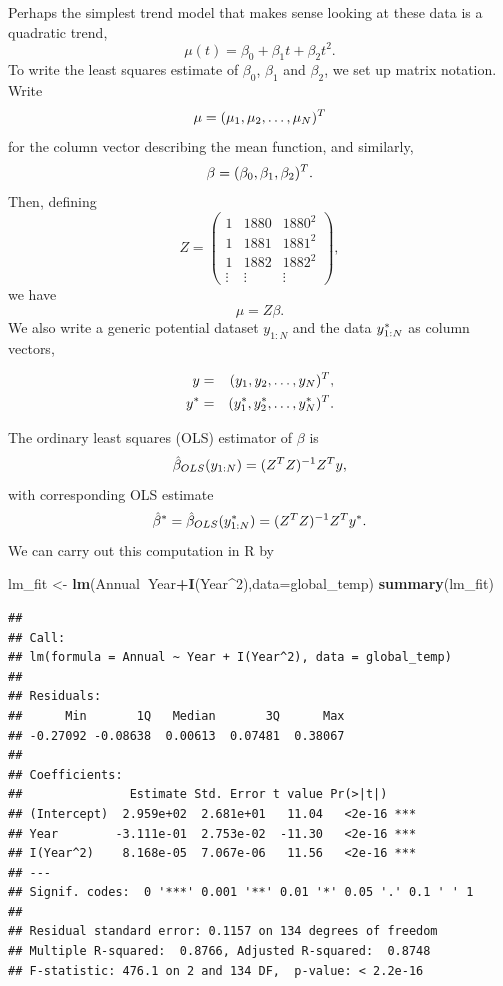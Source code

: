\documentclass[]{article}
\newenvironment{Shaded}{\begin{snugshade}}{\end{snugshade}}
\newcommand{\KeywordTok}[1]{\textcolor[rgb]{0.13,0.29,0.53}{\textbf{#1}}}
\newcommand{\DataTypeTok}[1]{\textcolor[rgb]{0.13,0.29,0.53}{#1}}
\newcommand{\DecValTok}[1]{\textcolor[rgb]{0.00,0.00,0.81}{#1}}
\newcommand{\StringTok}[1]{\textcolor[rgb]{0.31,0.60,0.02}{#1}}
\newcommand{\OperatorTok}[1]{\textcolor[rgb]{0.81,0.36,0.00}{\textbf{#1}}}
\newcommand{\NormalTok}[1]{#1}
\begin{document}
Perhaps the simplest trend model that makes sense looking at these data
is a quadratic trend, \[\mu(t)= \beta_0 + \beta_1 t + \beta_2 t^2.\] To
write the least squares estimate of \(\beta_0\), \(\beta_1\) and
\(\beta_2\), we set up matrix notation. Write
\[ \mu = (\mu_1,\mu_2,\dots,\mu_N)^{\scriptsize{T}}\] for the column vector
describing the mean function, and similarly,
\[ \beta = (\beta_0,\beta_1,\beta_2)^{\scriptsize{T}}.\] Then, defining
\[ Z = \left(\begin{array}{ccc}
1 & 1880 & 1880^2 \\
1 & 1881 & 1881^2 \\
1 & 1882 & 1882^2 \\
\vdots & \vdots & \vdots
\end{array}\right),\] we have \[ \mu = Z\beta.\] We also write a generic
potential dataset \(y_{1:N}\) and the data \(y_{1:N}^*\) as column
vectors,

\begin{eqnarray}
y &=& (y_1,y_2,\dots,y_N)^{\scriptsize{T}},\\
y^* & =& (y_1^*,y_2^*,\dots,y_N^*)^{\scriptsize{T}}.
\end{eqnarray}

The ordinary least squares (OLS) estimator of \(\beta\) is
\[\hat\beta_{OLS}(y_{1:N}) = (Z^{\scriptsize{T}} Z)^{-1}Z^{\scriptsize{T}} y,\]
with corresponding OLS estimate
\[\hat\beta^*=\hat\beta_{OLS}(y_{1:N}^*) = (Z^{\scriptsize{T}} Z)^{-1}Z^{\scriptsize{T}} y^*.\]
We can carry out this computation in R by

\begin{Shaded}
\begin{Highlighting}[]
\NormalTok{lm_fit <-}\StringTok{ }\KeywordTok{lm}\NormalTok{(Annual}\OperatorTok{~}\NormalTok{Year}\OperatorTok{+}\KeywordTok{I}\NormalTok{(Year}\OperatorTok{^}\DecValTok{2}\NormalTok{),}\DataTypeTok{data=}\NormalTok{global_temp)}
\KeywordTok{summary}\NormalTok{(lm_fit)}
\end{Highlighting}
\end{Shaded}

\begin{verbatim}
## 
## Call:
## lm(formula = Annual ~ Year + I(Year^2), data = global_temp)
## 
## Residuals:
##      Min       1Q   Median       3Q      Max 
## -0.27092 -0.08638  0.00613  0.07481  0.38067 
## 
## Coefficients:
##               Estimate Std. Error t value Pr(>|t|)    
## (Intercept)  2.959e+02  2.681e+01   11.04   <2e-16 ***
## Year        -3.111e-01  2.753e-02  -11.30   <2e-16 ***
## I(Year^2)    8.168e-05  7.067e-06   11.56   <2e-16 ***
## ---
## Signif. codes:  0 '***' 0.001 '**' 0.01 '*' 0.05 '.' 0.1 ' ' 1
## 
## Residual standard error: 0.1157 on 134 degrees of freedom
## Multiple R-squared:  0.8766, Adjusted R-squared:  0.8748 
## F-statistic: 476.1 on 2 and 134 DF,  p-value: < 2.2e-16
\end{verbatim}
\end{document}
